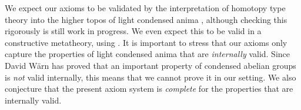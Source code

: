 We expect our axioms to be validated by the interpretation of homotopy type theory into the higher topos of light condensed anima \cite{shulman2019all}, although checking this rigorously is still work in progress. We even expect this to be valid in a constructive metatheory, using \cite{CRS21}. It is important to stress that our axioms only capture the properties of light condensed
anima that are {\em internally} valid. Since David W\"arn \cite{warn2024} has proved that an important property of condensed abelian groups is {\em not} valid internally, this means that we cannot prove it in our setting. We also conjecture that the present axiom system is {\em complete} for the properties that are internally valid.
